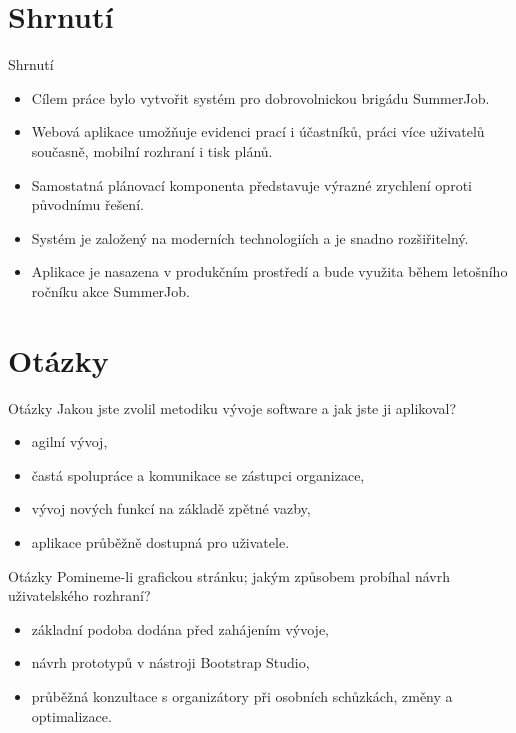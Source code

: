 \documentclass[czech,aspectratio=169]{beamer}
\begin{document}
  \section{Shrnutí}
  \begin{frame}{Shrnutí}
    \begin{itemize}
      \item Cílem práce bylo vytvořit systém pro dobrovolnickou brigádu SummerJob. 
      \item Webová aplikace umožňuje evidenci prací i účastníků, práci více uživatelů současně, mobilní rozhraní i tisk plánů. 
      \item Samostatná plánovací komponenta představuje výrazné zrychlení oproti původnímu řešení.
      \item Systém je založený na moderních technologiích a je snadno rozšiřitelný.
      \item Aplikace je nasazena v produkčním prostředí a bude využita během letošního ročníku akce SummerJob.
    \end{itemize}
  \end{frame}

  \section{Otázky}
  \begin{frame}[noframenumbering]{Otázky}
    Jakou jste zvolil metodiku vývoje software a jak jste ji aplikoval? \linebreak 
    \begin{itemize}
      \item agilní vývoj,
      \item častá spolupráce a komunikace se zástupci organizace,
      \item vývoj nových funkcí na základě zpětné vazby,
      \item aplikace průběžně dostupná pro uživatele.
    \end{itemize}
   \end{frame}

   \begin{frame}[noframenumbering]{Otázky}
    Pomineme-li grafickou stránku; jakým způsobem probíhal návrh uživatelského rozhraní? \linebreak 
    \begin{itemize}
      \item základní podoba dodána před zahájením vývoje,
      \item návrh prototypů v nástroji Bootstrap Studio,
      \item průběžná konzultace s organizátory při osobních schůzkách, změny a optimalizace.
    \end{itemize}
  \end{frame}
\end{document}
